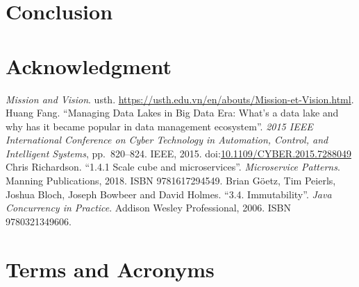 \documentclass[a4paper,oneside,12pt]{book}
\newcommand{\doi}[1]{doi:\href{https://doi.org/#1}{#1}}
\begin{document}
\chapter{Conclusion}

\begin{appendices}
\chapter{Acknowledgment}

\begin{thebibliography}{69}
   \emph{Mission and Vision}.  \acrlong{usth}.
    \url{https://usth.edu.vn/en/abouts/Mission-et-Vision.html}.
   Huang Fang.
    ``Managing Data Lakes in Big Data Era: What's a data lake
    and why has it became popular in data management ecosystem''.
    \emph{2015 IEEE International Conference on Cyber Technology
    in Automation, Control, and Intelligent Systems}, pp.~820--824.
    IEEE, 2015.  \doi{10.1109/CYBER.2015.7288049}
   Chris Richardson.
    ``1.4.1 Scale cube and microservices''.  \emph{Microservice Patterns}.
    Manning Publications, 2018.  ISBN 9781617294549.
   Brian Göetz, Tim Peierls, Joshua Bloch,
    Joseph Bowbeer and David Holmes.
    ``3.4. Immutability''.  \emph{Java Concurrency in Practice}.
    Addison Wesley Professional, 2006.  ISBN 9780321349606.
\end{thebibliography}

\chapter{Terms and Acronyms}
\printglossaries
\end{appendices}
\end{document}
